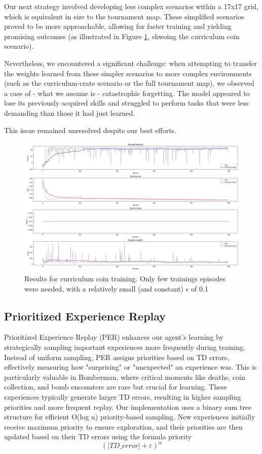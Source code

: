 \documentclass{article} %
\begin{document}
	Our next strategy involved developing less complex scenarios within a 17x17 grid, which is equivalent in size to the tournament map. These simplified scenarios proved to be more approachable, allowing for faster training and yielding promising outcomes (as illustrated in Figure \ref{fig:3}, shwoing the curriculum coin scenario).
	
	Nevertheless, we encountered a significant challenge: when attempting to transfer the weights learned from these simpler scenarios to more complex environments (such as the curriculum-crate scenario or the full tournament map), we observed a case of - what we assume is - catastrophic forgetting. The model appeared to lose its previously acquired skills and struggled to perform tasks that were less demanding than those it had just learned.
	
	This issue remained unresolved despite our best efforts.
	
	\begin{figure}[h!]
		\centering
		\includegraphics[width=1.0\textwidth]{images/curriculum_coin}
		\caption{Results for curriculum coin training. Only few trainings episodes were needed, with a relatively small (and constant) $\epsilon$ of 0.1}
		\label{fig:3}
	\end{figure}
	
	\subsection{Prioritized Experience Replay}
	Prioritized Experience Replay (PER) enhances our agent's learning by strategically sampling important experiences more frequently during training. Instead of uniform sampling, PER assigns priorities based on TD errors, effectively measuring how "surprising" or "unexpected" an experience was. This is particularly valuable in Bomberman, where critical moments like deaths, coin collection, and bomb encounters are rare but crucial for learning. These experiences typically generate larger TD errors, resulting in higher sampling priorities and more frequent replay. Our implementation uses a binary sum tree structure for efficient O(log n) priority-based sampling. New experiences initially receive maximum priority to ensure exploration, and their priorities are then updated based on their TD errors using the formula priority
	\begin{equation}
		(|TD\_error| + \varepsilon)^{\alpha}
	\end{equation}
	
\end{document}
